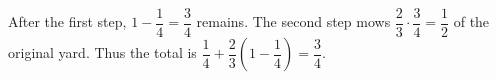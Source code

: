 After the first step, $1-\dfrac{1}{4}=\dfrac{3}{4}$ remains. The second step mows $\dfrac{2}{3}\cdot\dfrac{3}{4}=\dfrac{1}{2}$ of the original yard. Thus the total is $\dfrac{1}{4}+\dfrac{2}{3}(1-\dfrac{1}{4})=\boxed{\dfrac{3}{4}}$.
